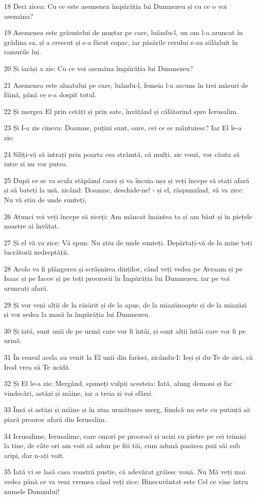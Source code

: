 \par 18 Deci zicea: Cu ce este asemenea împărăția lui Dumnezeu și cu ce o voi asemăna?
\par 19 Asemenea este grăuntelui de muștar pe care, luându-l, un om l-a aruncat în grădina sa, și a crescut și s-a făcut copac, iar păsările cerului s-au sălășluit în ramurile lui.
\par 20 Și iarăși a zis: Cu ce voi asemăna împărăția lui Dumnezeu?
\par 21 Asemenea este aluatului pe care, luându-l, femeia l-a ascuns în trei măsuri de făină, până ce s-a dospit totul.
\par 22 Și mergea El prin cetăți și prin sate, învățând și călătorind spre Ierusalim.
\par 23 Și I-a zis cineva: Doamne, puțini sunt, oare, cei ce se mântuiesc? Iar El le-a zis:
\par 24 Siliți-vă să intrați prin poarta cea strâmtă, că mulți, zic vouă, vor căuta să intre și nu vor putea.
\par 25 După ce se va scula stăpânul casei și va încuia ușa și veți începe să stați afară și să bateți la ușă, zicând: Doamne, deschide-ne! - și el, răspunzând, vă va zice: Nu vă știu de unde sunteți,
\par 26 Atunci voi veți începe să ziceți: Am mâncat înaintea ta și am băut și în piețele noastre ai învățat.
\par 27 Și el vă va zice: Vă spun: Nu știu de unde sunteți. Depărtați-vă de la mine toți lucrătorii nedreptății.
\par 28 Acolo va fi plângerea și scrâșnirea dinților, când veți vedea pe Avraam și pe Isaac și pe Iacov și pe toți proorocii în Împărăția lui Dumnezeu, iar pe voi aruncați afară.
\par 29 Și vor veni alții de la răsărit și de la apus, de la miazănoapte și de la miazăzi și vor ședea la masă în împărăția lui Dumnezeu.
\par 30 Și iată, sunt unii de pe urmă care vor fi întâi, și sunt alții întâi care vor fi pe urmă.
\par 31 În ceasul acela au venit la El unii din farisei, zicându-I: Ieși și du-Te de aici, că Irod vrea să Te ucidă.
\par 32 Și El le-a zis: Mergând, spuneți vulpii acesteia: Iată, alung demoni și fac vindecări, astăzi și mâine, iar a treia zi voi sfârși.
\par 33 Însă și astăzi și mâine și în ziua următoare merg, fiindcă nu este cu putință să piară prooroc afară din Ierusalim.
\par 34 Ierusalime, Ierusalime, care omori pe prooroci și ucizi cu pietre pe cei trimiși la tine, de câte ori am voit să adun pe fiii tăi, cum adună pasărea puii săi sub aripi, dar n-ați voit.
\par 35 Iată vi se lasă casa voastră pustie, că adevărat grăiesc vouă. Nu Mă veți mai vedea până ce va veni vremea când veți zice: Binecuvântat este Cel ce vine întru numele Domnului!

